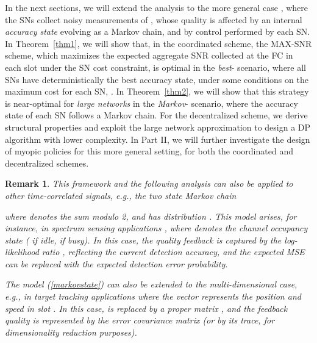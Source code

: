 \documentclass[10pt,twocolumn,twoside]{IEEEtran}
\theoremstyle{plain}
\newtheorem{remark}{Remark}
\begin{document}
In the next sections, we will extend the analysis to the more general case ,
where the SNs collect noisy measurements of , whose quality is affected by an internal \emph{accuracy state} evolving as a Markov chain,
and by control performed by each SN.
In Theorem~\ref{thm1},
we will show that,
in the coordinated scheme,
 the MAX-SNR scheme, which maximizes the 
expected aggregate SNR collected at the FC in each slot under the SN cost constraint,
is optimal in the \emph{best}-  scenario, where
all SNs have deterministically the best accuracy state,
under some conditions on the maximum cost for each SN, .
In Theorem~\ref{thm2}, we will show that this strategy is near-optimal for \emph{large networks} in the \emph{Markov}- scenario,
where the accuracy state of each SN follows a Markov chain.
For the decentralized scheme, we derive structural properties
and exploit the large network approximation to design a DP algorithm with lower complexity. 
In Part II, we will further investigate the design of myopic policies for this more general setting,
for both the coordinated and decentralized schemes.

 \begin{remark}
This framework and the following analysis can also be applied  to other time-correlated signals, \emph{e.g.}, the two state Markov chain
 
 where  denotes the sum modulo 2,
  and  has distribution .
 This model  arises, for instance, in spectrum sensing applications \cite{MicheISIT},
 where  denotes the channel occupancy state ( if idle,  if busy).
In this case, the quality feedback is captured by the log-likelihood ratio ,
 reflecting the current detection accuracy, and the expected MSE can be replaced with the expected detection error probability.
 
The model (\ref{markovstate}) can also be extended to the multi-dimensional case, \emph{e.g.},
 in target tracking applications where the vector  represents the position and speed in slot .
 In this case,  is replaced by a proper matrix \cite{Xiao}, and the feedback quality is represented by the error covariance matrix (or by its trace, for
 dimensionality reduction purposes).
 \end{remark}
\end{document}
